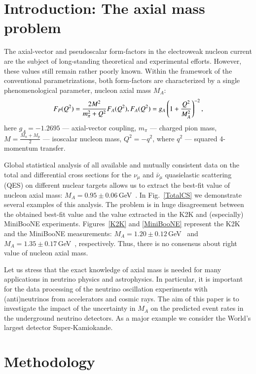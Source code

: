 \documentclass[review]{elsarticle}
\begin{document}
\linenumbers

\section{Introduction: The axial mass problem}

The axial-vector and pseudoscalar form-factors in the electroweak nucleon current are the subject of long-standing theoretical and experimental efforts. However, these values still remain rather poorly known. Within the framework of the conventional parametrizations, both form-factors are characterized by a single phenomenological parameter, nucleon axial mass $M_A$:
\begin{equation}
F_{P}(Q^{2})={}\frac{2M^{2}}{m_{\pi}^{2}+Q^{2}}F_{A}(Q^{2}),\\
F_{A}(Q^{2})={}g_{A}\left(1+\frac{Q^{2}}{M_{A}^{2}}\right)^{-2},
\end{equation}
here $g_{A}=-1.2695$ --- axial-vector coupling, $m_{\pi}$ --- charged pion mass, $M=\frac{M_{n}+M_{p}}{2}$ --- isoscalar nucleon mass, $Q^{2}=-q^{2}$, where $q^{2}$ --- squared 4-momentum transfer.

Global statistical analysis of all available and mutually consistent data on the total and differential cross sections for the $\nu_{\mu}$ and $\bar\nu_{\mu}$ quasielastic scattering (QES) on different nuclear targets allows us to extract the best-fit value of nucleon axial mass: $M_A=0.95\pm0.06$\,GeV~\cite{Kuzmin:2007kr}. In Fig.~\ref{TotalCS} we demonstrate several examples of this analysis. The problem is in huge disagreement between the obtained best-fit value and the value extracted in the K2K and (especially) MiniBooNE experiments. Figures~\ref{K2K} and \ref{MiniBooNE} represent the K2K and the MiniBooNE measurements: $M_A=1.20\pm0.12$\,GeV~\cite{Gran:2006jn} and $M_{A}=1.35\pm0.17$\,GeV~\cite{AguilarArevalo:2010zc}, respectively. Thus, there is no consensus about right value of nucleon axial mass.

Let us stress that the exact knowledge of axial mass is needed for many applications in neutrino physics and astrophysics. In particular, it is important for the data processing of the neutrino oscillation experiments with (anti)neutrinos from accelerators and cosmic rays. The aim of this paper is to investigate the impact of the uncertainty in $M_A$ on the predicted event rates in the underground neutrino detectors. As a major example we consider the World's largest detector Super-Kamiokande.

\section{Methodology}
\end{document}
